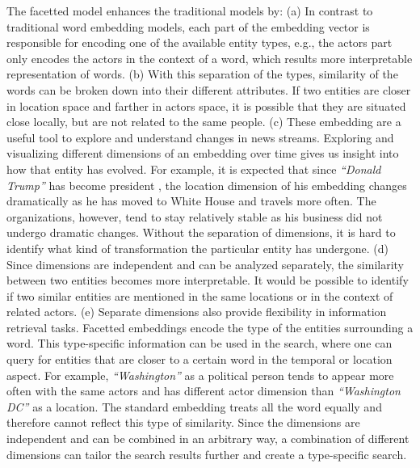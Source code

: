 The facetted model enhances the traditional models by: (a) In contrast to traditional word embedding models, each part of the embedding vector is responsible for encoding one of the available entity types, e.g., the actors part only encodes the actors in the context of a word, which results  more interpretable representation of words. (b) With this separation of the types, similarity of the words can be broken down into their different attributes. If two entities are closer in location space and farther in actors space, it is possible that they are situated close locally, but are not related to the same people. (c) These embedding are a useful tool to explore and understand changes in news streams. Exploring and visualizing different dimensions of an embedding over time  gives us insight into how that entity has evolved. For example, it is expected that since \emph{``Donald Trump''} has become president , the location dimension of his embedding changes dramatically as he has moved to White House and travels more often. The organizations, however, tend to stay relatively stable as his business did not undergo dramatic changes. Without the separation of dimensions, it is hard to identify what kind of transformation the particular entity has undergone. (d) Since dimensions are independent and can be analyzed separately, the similarity between two entities becomes more interpretable. It would be possible to identify if two similar entities are mentioned in the same locations or in the context of related actors. (e) Separate dimensions also provide flexibility in information retrieval tasks. Facetted embeddings encode the type of the entities surrounding a word. This type-specific information can be used in the search, where one can query for entities that are closer to a certain word in the temporal or location aspect. For example, \emph{``Washington''} as a political person tends to appear more often with the same actors and has  different actor dimension than \emph{``Washington DC''} as a location. The standard embedding treats all the word equally and therefore\deleted{,} can\deleted{ }not reflect this type of similarity. Since the dimensions are independent and can be combined in an arbitrary way, a combination of different dimensions can tailor the search results further and create a type-specific search. 



